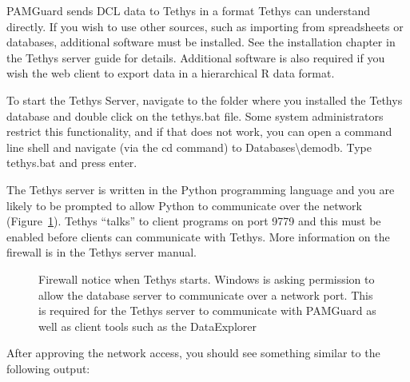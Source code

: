 \documentclass[
]{article}
\begin{document}
PAMGuard sends DCL data to Tethys in a format Tethys can understand
directly. If you wish to use other sources, such as importing from
spreadsheets or databases, additional software must be installed. See
the installation chapter in the Tethys server guide for details.
Additional software is also required if you wish the web client to
export data in a hierarchical R data format.

To start the Tethys Server, navigate to the folder where you installed
the Tethys database and double click on the tethys.bat file. Some system
administrators restrict this functionality, and if that does not work,
you can open a command line shell and navigate (via the cd command) to
Databases\textbackslash demodb. Type tethys.bat and press enter.

The Tethys server is written in the Python programming language and you
are likely to be prompted to allow Python to communicate over the
network (Figure~\ref{fig-tethyswarning}). Tethys ``talks'' to client
programs on port 9779 and this must be enabled before clients can
communicate with Tethys. More information on the firewall is in the
Tethys server manual.

\begin{figure}


\caption{\label{fig-tethyswarning}Firewall notice when Tethys starts.
Windows is asking permission to allow the database server to communicate
over a network port. This is required for the Tethys server to
communicate with PAMGuard as well as client tools such as the
DataExplorer}

\end{figure}%

After approving the network access, you should see something similar to
the following output:
\end{document}
